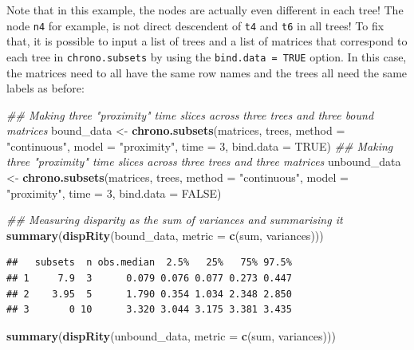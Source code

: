\documentclass[
]{book}
\newenvironment{Shaded}{\begin{snugshade}}{\end{snugshade}}
\newcommand{\CommentTok}[1]{\textcolor[rgb]{0.56,0.35,0.01}{\textit{#1}}}
\newcommand{\DataTypeTok}[1]{\textcolor[rgb]{0.13,0.29,0.53}{#1}}
\newcommand{\DecValTok}[1]{\textcolor[rgb]{0.00,0.00,0.81}{#1}}
\newcommand{\KeywordTok}[1]{\textcolor[rgb]{0.13,0.29,0.53}{\textbf{#1}}}
\newcommand{\NormalTok}[1]{#1}
\newcommand{\OtherTok}[1]{\textcolor[rgb]{0.56,0.35,0.01}{#1}}
\newcommand{\StringTok}[1]{\textcolor[rgb]{0.31,0.60,0.02}{#1}}
\begin{document}
Note that in this example, the nodes are actually even different in each tree! The node \texttt{n4} for example, is not direct descendent of \texttt{t4} and \texttt{t6} in all trees!
To fix that, it is possible to input a list of trees and a list of matrices that correspond to each tree in \texttt{chrono.subsets} by using the \texttt{bind.data\ =\ TRUE} option.
In this case, the matrices need to all have the same row names and the trees all need the same labels as before:

\begin{Shaded}
\begin{Highlighting}[]
\CommentTok{\#\# Making three "proximity" time slices across three trees and three bound matrices}
\NormalTok{bound\_data \textless{}{-}}\StringTok{ }\KeywordTok{chrono.subsets}\NormalTok{(matrices, trees,}
                             \DataTypeTok{method =} \StringTok{"continuous"}\NormalTok{,}
                             \DataTypeTok{model =} \StringTok{"proximity"}\NormalTok{,}
                             \DataTypeTok{time =} \DecValTok{3}\NormalTok{,}
                             \DataTypeTok{bind.data =} \OtherTok{TRUE}\NormalTok{)}
\CommentTok{\#\# Making three "proximity" time slices across three trees and three matrices}
\NormalTok{unbound\_data \textless{}{-}}\StringTok{ }\KeywordTok{chrono.subsets}\NormalTok{(matrices, trees,}
                               \DataTypeTok{method =} \StringTok{"continuous"}\NormalTok{,}
                               \DataTypeTok{model =} \StringTok{"proximity"}\NormalTok{,}
                               \DataTypeTok{time =} \DecValTok{3}\NormalTok{,}
                               \DataTypeTok{bind.data =} \OtherTok{FALSE}\NormalTok{)}

\CommentTok{\#\# Measuring disparity as the sum of variances and summarising it}
\KeywordTok{summary}\NormalTok{(}\KeywordTok{dispRity}\NormalTok{(bound\_data, }\DataTypeTok{metric =} \KeywordTok{c}\NormalTok{(sum, variances)))}
\end{Highlighting}
\end{Shaded}

\begin{verbatim}
##   subsets  n obs.median  2.5%   25%   75% 97.5%
## 1     7.9  3      0.079 0.076 0.077 0.273 0.447
## 2    3.95  5      1.790 0.354 1.034 2.348 2.850
## 3       0 10      3.320 3.044 3.175 3.381 3.435
\end{verbatim}

\begin{Shaded}
\begin{Highlighting}[]
\KeywordTok{summary}\NormalTok{(}\KeywordTok{dispRity}\NormalTok{(unbound\_data, }\DataTypeTok{metric =} \KeywordTok{c}\NormalTok{(sum, variances)))}
\end{Highlighting}
\end{Shaded}
\end{document}
